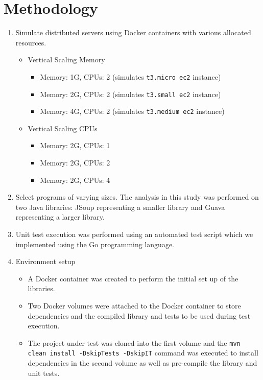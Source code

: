\section{Methodology}
\label{Methodology}
\begin{enumerate}
\item Simulate distributed servers using Docker containers with various allocated resources.
\begin{itemize}
        \item Vertical Scaling Memory 
        \begin{itemize}
            \item Memory: 1G, CPUs: 2 (simulates \texttt{t3.micro ec2} instance) 
            \item Memory: 2G, CPUs: 2 (simulates \texttt{t3.small ec2} instance) 
            \item Memory: 4G, CPUs: 2 (simulates \texttt{t3.medium ec2} instance) 
        \end{itemize}
        \item Vertical Scaling CPUs 
        \begin{itemize}
            \item Memory: 2G, CPUs: 1 
            \item Memory: 2G, CPUs: 2 
            \item Memory: 2G, CPUs: 4 
        \end{itemize}
    \end{itemize}
\item Select programs of varying sizes. The analysis in this study was performed on two Java libraries: JSoup representing a smaller library and Guava representing a larger library. 
\item Unit test execution was performed using an automated test script which we implemented using the Go programming language. 
\item Environment setup 
\begin{itemize}
        \item A Docker container was created to perform the initial set up of the libraries. 
        \item Two Docker volumes were attached to the Docker container to store dependencies and the compiled library and tests to be used during test execution. 
        \item The project under test was cloned into the first volume and the \texttt{mvn clean install {-}DskipTests {-}DskipIT} command was executed to install dependencies in the second volume as well as pre-compile the library and unit tests. 

\end{itemize}
\end{enumerate}
